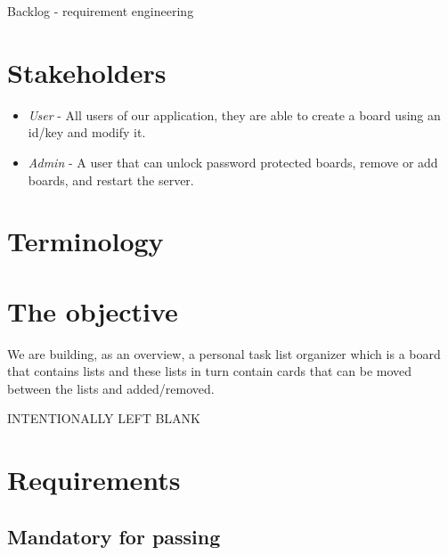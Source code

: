 \documentclass{article}
\begin{document}
	\vfill

	\begin{center}
    	\Large{Backlog - requirement engineering}
	\end{center}

	\section{Stakeholders}

	\begin{itemize}
    	\item \emph{User} - All users of our application, they are able to create a board using an id/key and modify it.
    	\item \emph{Admin} - A user that can unlock password protected boards, remove or add boards, and restart the server.
	\end{itemize}

	\section{Terminology}
	\vspace{-0.5cm}
	\printglossary[title={}]

	\section{The objective}

	We are building, as an overview, a personal task list organizer which is a board that contains lists and these lists in turn contain cards that can be moved between the lists and added/removed.

	\vfill
	\begin{center} \LARGE \textcolor{black!50!red!50!white}{\scshape INTENTIONALLY LEFT BLANK} \end{center}
	\vfill


	\clearpage

	\section{Requirements}

	\subsection{Mandatory for passing}
\end{document}
